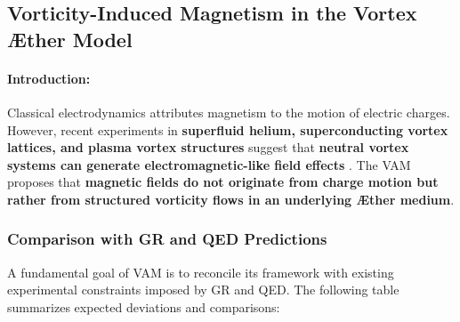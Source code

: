 
\subsection{Vorticity-Induced Magnetism in the Vortex Æther Model}


    \begin{abstract}
This section explores the hypothesis that magnetism arises from structured vorticity in an inviscid, incompressible superfluid medium—the Æther. The \textbf{Vortex Æther Model (VAM)} proposes that stable vortex filaments and knots generate field effects traditionally associated with electromagnetism. By deriving fundamental vorticity-based equations, we establish a physical basis for magnetism without requiring moving charge. Using key VAM constants—\( \mathbf{v}_{\scriptscriptstyle\boldsymbol{\circlearrowleft}} \) (core tangential velocity), \( r_c \) (vortex-core radius), and \( F_{\max} \) (maximum force constraint)—we provide a framework where \textbf{magnetic phenomena emerge as a consequence of structured vorticity flows}.
    We also outline experimental tests in superfluid helium, superconductors, and plasma physics to validate the predictions of VAM.
    \end{abstract}

    \paragraph*{Introduction:}

Classical electrodynamics attributes magnetism to the motion of electric charges. However, recent experiments in \textbf{superfluid helium, superconducting vortex lattices, and plasma vortex structures} suggest that \textbf{neutral vortex systems can generate electromagnetic-like field effects} \cite{superfluid_he_interferometers}. The VAM proposes that \textbf{magnetic fields do not originate from charge motion but rather from structured vorticity flows in an underlying Æther medium}.

\subsubsection*{Comparison with GR and QED Predictions}
A fundamental goal of VAM is to reconcile its framework with existing experimental constraints imposed by GR and QED. The following table summarizes expected deviations and comparisons:

